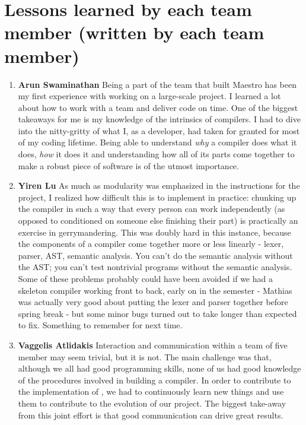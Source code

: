 \section{Lessons learned by each team member (written by each team member)}
\begin{enumerate}
\item \textbf{Arun Swaminathan} \newline
Being a part of the team that built Maestro has been my first experience with working on a large-scale project. I learned a lot about how to work with a team and deliver code on time.
One of the biggest takeaways for me is my knowledge of the intrinsics of compilers. I had to dive into the nitty-gritty of what I, as a developer, had taken for granted for most of my coding lifetime. Being able to understand \textit{why} a compiler does what it does, \textit{how} it does it and understanding how all of its parts come together to make a robust piece of software is of the utmost importance.

\item \textbf{Yiren Lu} \newline
As much as modularity was emphasized in the instructions for the project, I
realized how difficult this is to implement in practice: chunking up the
compiler in such a way that every person can work independently (as opposed to
conditioned on someone else finishing their part) is practically an exercise in
gerrymandering. This was doubly hard in this instance, because the components
of a compiler come together more or less linearly - lexer, parser, AST,
semantic analysis. You can't do the semantic analysis without the AST; you
can't test nontrivial programs without the semantic analysis. Some of these
problems probably could have been avoided if we had a skeleton compiler working
front to back, early on in the semester - Mathias was actually very good about
putting the lexer and parser together before spring break - but some minor bugs
turned out to take longer than expected to fix. Something to remember for next
time.

\item \textbf{Vaggelis Atlidakis} \newline
Interaction and communication within a team of five member may seem trivial,
but it is not. The main challenge was that, although we all had
good programming skills, none of us had good knowledge of the procedures
involved in building a compiler. In order to contribute to the implementation
of \lang{}, we had to continuously learn new things and use them to contribute
to the evolution of our project. The biggest take-away from this joint effort is
that good communication can drive great results.



\end{enumerate}

